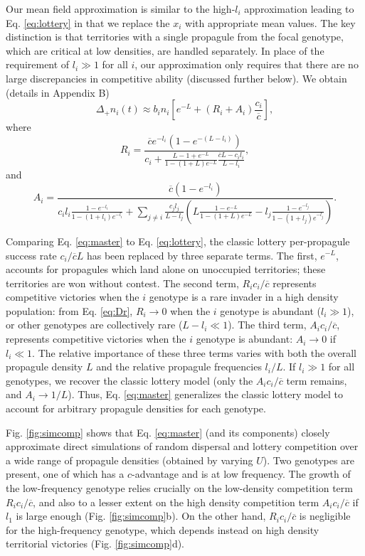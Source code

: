 \documentclass[11pt]{article}
\begin{document}
Our mean field approximation is similar to the high-$l_i$ approximation leading to Eq. \eqref{eq:lottery} in that we replace the $x_i$ with appropriate mean values. The key distinction is that territories with a single propagule from the focal genotype, which are critical at low densities, are handled separately. In place of the requirement of $l_i\gg 1$ for all $i$, our approximation only requires that there are no large discrepancies in competitive ability (discussed further below). We obtain (details in Appendix B)
\begin{equation}
\Delta_+ n_i(t)\approx b_i n_i\left[e^{-L}+(R_i+A_i)\frac{c_i}{\overline{c}}\right], \label{eq:master}
\end{equation}
where
\begin{equation}
R_i=\frac{\overline{c}e^{-l_i}(1-e^{-(L-l_i)})}{c_i +\frac{L-1+e^{-L}}{1-(1+L)e^{-L}}\frac{\overline{c}L- c_il_i}{L-l_i}},\label{eq:Dr}
\end{equation}
and
\begin{equation}
A_i=\frac{\overline{c}(1-e^{-l_i})}{c_il_i\frac{1-e^{-l_i}}{1-(1+l_i)e^{-l_i}}+\sum_{j\neq i}\frac{c_jl_j}{L-l_j}\left(L\frac{1-e^{-L}}{1-(1+L)e^{-L}}-l_j\frac{1-e^{-l_j}}{1-(1+l_j)e^{-l_j}}\right)}.\label{eq:Da}
\end{equation}

Comparing Eq. \eqref{eq:master} to Eq. \eqref{eq:lottery}, the classic lottery per-propagule success rate $c_i/\overline{c}L$ has been replaced by three separate terms. The first, $e^{-L}$, accounts for propagules which land alone on unoccupied territories; these territories are won without contest. The second term, $R_i c_i/\overline{c}$ represents competitive victories when the $i$ genotype is a rare invader in a high density population: from Eq. \eqref{eq:Dr}, $R_i\rightarrow 0$ when the $i$ genotype is abundant ($l_i\gg 1$), or other genotypes are collectively rare ($L-l_i\ll 1$). The third term, $A_ic_i/\overline{c}$, represents competitive victories when the $i$ genotype is abundant: $A_i\rightarrow 0$ if $l_i\ll 1$. The relative importance of these three terms varies with both the overall propagule density $L$ and the relative propagule frequencies $l_i/L$. If $l_i\gg 1$ for all genotypes, we recover the classic lottery model (only the $A_ic_i/\overline{c}$ term remains, and $A_i\rightarrow 1/L$). Thus, Eq. \eqref{eq:master} generalizes the classic lottery model to account for arbitrary propagule densities for each genotype. 

Fig. \ref{fig:simcomp} shows that Eq. \eqref{eq:master} (and its components) closely approximate direct simulations of random dispersal and lottery competition over a wide range of propagule densities (obtained by varying $U$). Two genotypes are present, one of which has a $c$-advantage and is at low frequency. The growth of the low-frequency genotype relies crucially on the low-density competition term $R_i c_i/\overline{c}$, and also to a lesser extent on the high density competition term $A_i c_i/\overline{c}$ if $l_1$ is large enough (Fig. \ref{fig:simcomp}b). On the other hand, $R_i c_i/\overline{c}$ is negligible for the high-frequency genotype, which depends instead on high density territorial victories (Fig. \ref{fig:simcomp}d). 
\end{document}
